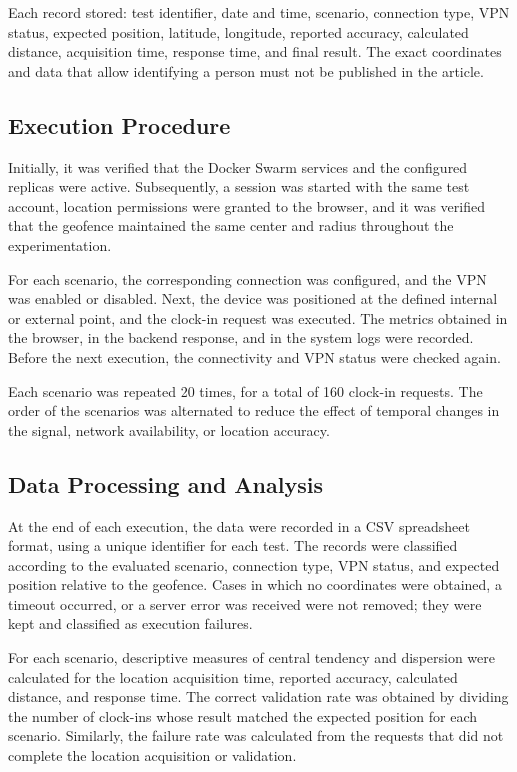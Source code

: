 \documentclass[runningheads]{llncs}
\begin{document}
Each record stored: test identifier, date and time, scenario, connection type, VPN status, expected position, latitude, longitude, reported accuracy, calculated distance, acquisition time, response time, and final result. The exact coordinates and data that allow identifying a person must not be published in the article.

\subsection{Execution Procedure}
Initially, it was verified that the Docker Swarm services and the configured replicas were active. Subsequently, a session was started with the same test account, location permissions were granted to the browser, and it was verified that the geofence maintained the same center and radius throughout the experimentation.

For each scenario, the corresponding connection was configured, and the VPN was enabled or disabled. Next, the device was positioned at the defined internal or external point, and the clock-in request was executed. The metrics obtained in the browser, in the backend response, and in the system logs were recorded. Before the next execution, the connectivity and VPN status were checked again.

Each scenario was repeated 20 times, for a total of 160 clock-in requests. The order of the scenarios was alternated to reduce the effect of temporal changes in the signal, network availability, or location accuracy.

\subsection{Data Processing and Analysis}
At the end of each execution, the data were recorded in a CSV spreadsheet format, using a unique identifier for each test. The records were classified according to the evaluated scenario, connection type, VPN status, and expected position relative to the geofence. Cases in which no coordinates were obtained, a timeout occurred, or a server error was received were not removed; they were kept and classified as execution failures.

For each scenario, descriptive measures of central tendency and dispersion were calculated for the location acquisition time, reported accuracy, calculated distance, and response time. The correct validation rate was obtained by dividing the number of clock-ins whose result matched the expected position for each scenario. Similarly, the failure rate was calculated from the requests that did not complete the location acquisition or validation.
\end{document}
